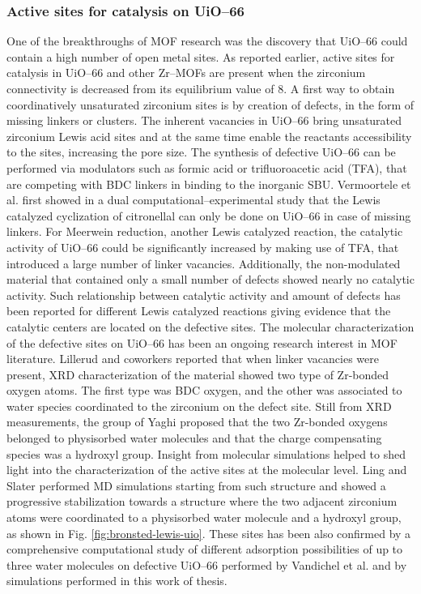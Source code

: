 \subsubsection{Active sites for catalysis on UiO--66}
One of the breakthroughs of MOF research was the discovery that UiO--66 could contain a high number of open metal sites. As reported earlier, active sites for catalysis in UiO--66 and other Zr--MOFs are present when the zirconium connectivity is decreased from its equilibrium value of 8. 
\npar
A first way to obtain coordinatively unsaturated zirconium sites is by creation of defects, in the form of missing linkers or clusters. The inherent vacancies in UiO--66 bring unsaturated zirconium Lewis acid sites\cite{wu2013unusual, shearer2014tuned, vermoortele2013synthesis, vandichel2015active, liu2016probing} and at the same time enable the reactants accessibility to the sites, increasing the pore size. The synthesis of defective UiO--66 can be performed via modulators such as formic acid or trifluoroacetic acid (TFA), that are competing with BDC linkers in binding to the inorganic SBU. 
Vermoortele et al. first showed in a dual computational--experimental study that the Lewis catalyzed cyclization of citronellal can only be done on UiO--66 in case of missing linkers\cite{vermoortele2012electronic}. For Meerwein reduction, another Lewis catalyzed reaction, the catalytic activity of UiO--66 could be significantly increased by making use of TFA, that introduced a large number of linker vacancies. Additionally, the non-modulated material that contained only a small number of defects showed nearly no catalytic activity\cite{vermoortele2013synthesis}. Such relationship between catalytic activity and amount of defects has been reported for different Lewis catalyzed reactions giving evidence that the catalytic centers are located on the defective sites. 
\npar
The molecular characterization of the defective sites on UiO--66 has been an ongoing research interest in MOF literature. Lillerud and coworkers \cite{oien2014detailed} reported that when linker vacancies were present, XRD characterization of the material showed two type of Zr-bonded oxygen atoms. The first type was BDC oxygen, and the other was associated to water species coordinated to the zirconium on the defect site. Still from XRD measurements, the group of Yaghi \cite{trickett2015definitive} proposed that the two Zr-bonded oxygens belonged to physisorbed water molecules and that the charge compensating species was a hydroxyl group. Insight from molecular simulations helped to shed light into the characterization of the active sites at the molecular level. Ling and Slater \cite{ling2016dynamic} performed MD simulations starting from such structure and showed a progressive stabilization towards a structure where the two adjacent zirconium atoms were coordinated to a physisorbed water molecule and a hydroxyl group, as shown in Fig. \ref{fig:bronsted-lewis-uio}. These sites has been also confirmed by a comprehensive computational study of different adsorption possibilities of up to three water molecules on defective UiO--66 performed by Vandichel et al. \cite{vandichel2016water} and by simulations performed in this work of thesis. 
